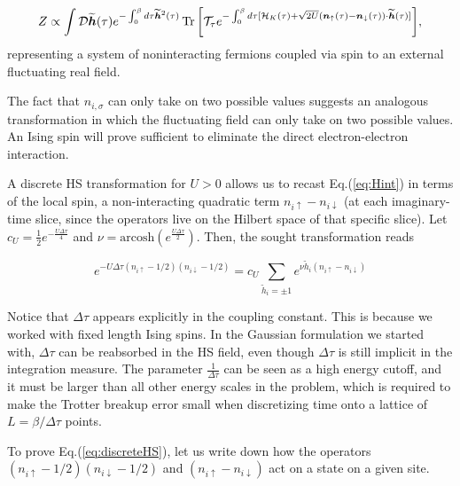 \begin{equation}
Z \propto \int \mathcal{D} \widetilde{\bm h} ( \tau) e^{-\int_0^\beta d\tau \widetilde{\bm h}^2 ( \tau ) } \operatorname{Tr} \bigg[ \mathcal{T}_\tau e^{ -\int_0^\beta d\tau [ \mathcal{H}_K ( \tau ) + \sqrt{2U} ( \bm n_{\uparrow} (\tau) - \bm n_{\downarrow} (\tau ) ) \cdot \widetilde{\bm h}(\tau) ] } \bigg] ,
\end{equation}
representing a system of noninteracting fermions coupled via spin to an external fluctuating real field.

The fact that $n_{i,\sigma}$ can only take on two possible values suggests an analogous transformation in which the fluctuating field can only take on two possible values.
An Ising spin will prove sufficient to eliminate the direct electron-electron interaction.

A discrete HS transformation for $U > 0$ allows us to recast Eq.(\ref{eq:Hint}) in terms of the local spin, a non-interacting quadratic term $n_{i\uparrow} - n_{i\downarrow} $ (at each imaginary-time slice, since the operators live on the Hilbert space of that specific slice).
Let $c_U = \frac{1}{2} e^{-\frac{U\Delta \tau}{4}}$ and $\nu = \text{arcosh} ( e^{\frac{U\Delta\tau}{2}})$.
Then, the sought transformation reads

\begin{equation}\label{eq:discreteHS}
e^{-U \Delta\tau (n_{i\uparrow} - 1/2 ) (n_{i\downarrow} - 1/2 )} = c_U \sum_{\widetilde{h}_i = \pm 1} e^{\nu \widetilde{h}_i (n_{i\uparrow} - n_{i\downarrow} )}
\end{equation}

Notice that $\Delta \tau$ appears explicitly in the coupling constant.
This is because we worked with fixed length Ising spins.
In the Gaussian formulation we started with, $\Delta \tau$ can be reabsorbed in the HS field, even though $\Delta \tau$ is still implicit in the integration measure.
The parameter $\frac{1}{\Delta \tau}$ can be seen as a high energy cutoff, and it must be larger than all other energy scales in the problem, which is required to make the Trotter breakup error small when discretizing time onto 	a lattice of $L = \beta / \Delta \tau$ points.

To prove Eq.(\ref{eq:discreteHS}), let us write down how the operators  $(n_{i\uparrow} - 1/2 ) (n_{i\downarrow} - 1/2 )$ and $(n_{i\uparrow} - n_{i\downarrow} )$ act on a state on a given site.

